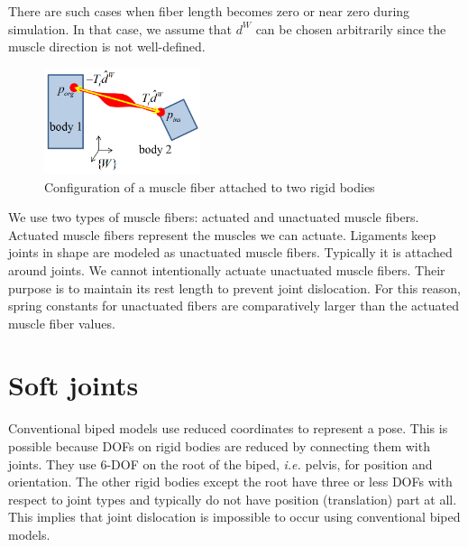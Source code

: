 \documentclass[master,english,final]{kaist-ucs}
\begin{document}
There are such cases when fiber length becomes zero or near zero during simulation.
In that case, we assume that $d^{W}$ can be chosen arbitrarily
since the muscle direction is not well-defined.

\begin{figure}[h!]
  \centering
  \includegraphics[width=1.8in]{orgins}
  \caption{Configuration of a muscle fiber attached to two rigid bodies}
  \label{orgins}
\end{figure}


We use two types of muscle fibers: actuated and unactuated muscle fibers.
Actuated muscle fibers represent the muscles we can actuate.
Ligaments keep joints in shape are modeled as unactuated muscle fibers.
Typically it is attached around joints. We cannot intentionally actuate unactuated muscle fibers.
Their purpose is to maintain its rest length to prevent joint dislocation.
For this reason, spring constants for unactuated fibers are comparatively larger than
the actuated muscle fiber values.


\section{Soft joints}

Conventional biped models use reduced coordinates to represent a pose.
This is possible because DOFs on rigid bodies are reduced by connecting them with
joints. They use 6-DOF on the root of the biped, \emph{i.e.} pelvis, for position and orientation.
The other rigid bodies except the root have three or less DOFs with respect to joint types and
typically do not have position (translation) part at all.
This implies that joint dislocation is impossible to occur
using conventional biped models.
\end{document}
